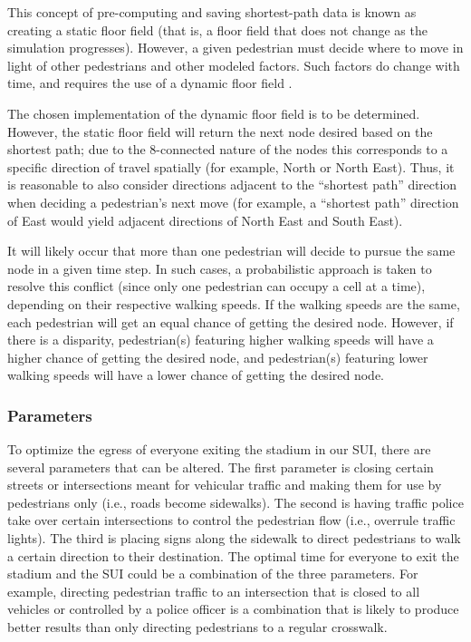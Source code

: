 \documentclass[12pt]{article}
\begin{document}
This concept of pre-computing and saving shortest-path data is known as creating
a static floor field (that is, a floor field that does not change as the
simulation progresses). However, a given pedestrian must decide where to move
in light of other pedestrians and other modeled factors. Such factors do change
with time, and requires the use of a dynamic floor field
\cite{burstedde2001simulation}.

The chosen implementation of the dynamic floor field is to be determined.
However, the static floor field will return the next node desired based on the
shortest path; due to the 8-connected nature of the nodes this corresponds
to a specific direction of travel spatially (for example, North or North East).
Thus, it is reasonable to also consider directions adjacent to the “shortest
path” direction when deciding a pedestrian’s next move (for example, a “shortest
path” direction of East would yield adjacent directions of North East and
South East).

It will likely occur that more than one pedestrian will decide to pursue the
same node in a given time step. In such cases, a probabilistic approach is taken
to resolve this conflict (since only one pedestrian can occupy a cell at a
time), depending on their respective walking speeds. If the walking speeds are
the same, each pedestrian will get an equal chance of getting the desired node.
However, if there is a disparity, pedestrian(s) featuring higher walking speeds
will have a higher chance of getting the desired node, and pedestrian(s)
featuring lower walking speeds will have a lower chance of getting the desired
node.

\subsubsection{Parameters}

To optimize the egress of everyone exiting the stadium in our SUI, there are
several parameters that can be altered. The first parameter is closing certain
streets or intersections meant for vehicular traffic and making them for use by
pedestrians only (i.e.,
roads become sidewalks). The second is having traffic police take over certain
intersections to control the pedestrian flow (i.e., overrule traffic lights).
The third is placing signs along the sidewalk to direct pedestrians to walk a
certain direction to their destination. The optimal time for everyone to exit
the stadium and the SUI could be a combination of the three parameters.
For example, directing pedestrian traffic to an intersection that is closed to
all vehicles or controlled by a police officer is a combination that is likely
to produce better results than only directing pedestrians to a regular
crosswalk.
\end{document}
